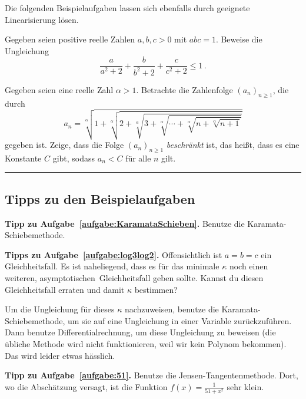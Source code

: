 Die folgenden Beispielaufgaben lassen sich ebenfalls durch geeignete Linearisierung lösen.

\begin{aufgabe*}\label{aufgabe:MatBoj2015}
	Gegeben seien positive reelle Zahlen $a,b,c>0$ mit $abc=1$. Beweise die Ungleichung
	\begin{equation*}
		\frac{a}{a^2+2}+\frac{b}{b^2+2}+\frac{c}{c^2+2}\leqslant 1\,.
	\end{equation*}
\end{aufgabe*}

\begin{aufgabe*}\label{aufgabe:DEMO2013}
	Gegeben seien eine reelle Zahl $\alpha>1$. Betrachte die Zahlenfolge $(a_n)_{n\geqslant 1}$, die durch
	\begin{equation*}
		a_n=\sqrt[\alpha]{1+\sqrt[\alpha]{2+\sqrt[\alpha]{3+\sqrt[\alpha]{\dotsb+\sqrt[\alpha]{n+\sqrt[\alpha]{n+1}}}}}}
	\end{equation*}
	gegeben ist. Zeige, dass die Folge $(a_n)_{n\geqslant 1}$ \emph{beschränkt} ist, das heißt, dass es eine Konstante $C$ gibt, sodass $a_n<C$ für alle $n$ gilt.
\end{aufgabe*}

\vfill\hrule\vspace{-1em}

\subsection*{Tipps zu den Beispielaufgaben}
\textbf{Tipp zu Aufgabe~\ref{aufgabe:KaramataSchieben}.} Benutze die Karamata-Schiebemethode.%

\textbf{Tipps zu Aufgabe~\ref{aufgabe:log3log2}.} Offensichtlich ist $a=b=c$ ein Gleichheitsfall. Es ist naheliegend, dass es für das minimale $\kappa$ noch einen weiteren, \glqq asymptotischen\grqq\ Gleichheitsfall geben sollte. Kannst du diesen Gleichheitsfall erraten und damit $\kappa$ bestimmen?

Um die Ungleichung für dieses $\kappa$ nachzuweisen, benutze die Karamata-Schiebemethode, um sie auf eine Ungleichung in einer Variable zurückzuführen. Dann benutze Differentialrechnung, um diese Ungleichung zu beweisen (die übliche Methode wird nicht funktionieren, weil wir kein Polynom bekommen). Das wird leider etwas hässlich.

\textbf{Tipp zu Aufgabe~\ref{aufgabe:51}.} Benutze die Jensen-Tangentenmethode. Dort, wo die Abschätzung versagt, ist die Funktion $f(x)=\frac1{51+x^2}$ sehr klein.

